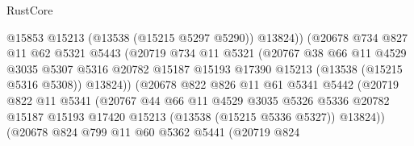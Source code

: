 \begin{lexlean}{RustCore}
\begin{coremodule}
                                @15853
                                @15213
                                (@13538 (@15215 @5297 @5290))
                                @13824))
                            (@20678
                              @734
                              @827
                              @11
                              @62
                              @5321
                              @5443
                              (@20719
                                @734
                                @11
                                @5321
                                (@20767
                                  @38
                                  @66
                                  @11
                                  @4529
                                  @3035
                                  @5307
                                  @5316
                                  @20782
                                  @15187
                                  @15193
                                  @17390
                                  @15213
                                  (@13538 (@15215 @5316 @5308))
                                  @13824))
                              (@20678
                                @822
                                @826
                                @11
                                @61
                                @5341
                                @5442
                                (@20719
                                  @822
                                  @11
                                  @5341
                                  (@20767
                                    @44
                                    @66
                                    @11
                                    @4529
                                    @3035
                                    @5326
                                    @5336
                                    @20782
                                    @15187
                                    @15193
                                    @17420
                                    @15213
                                    (@13538 (@15215 @5336 @5327))
                                    @13824))
                                (@20678
                                  @824
                                  @799
                                  @11
                                  @60
                                  @5362
                                  @5441
                                  (@20719
                                    @824

\end{coremodule}
\end{lexlean}
